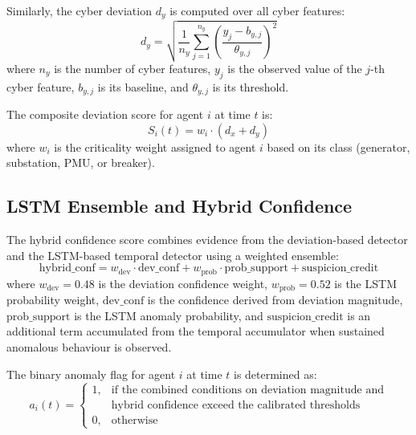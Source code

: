 \par \vspace{0.25cm}
\noindent
Similarly, the cyber deviation $d_y$ is computed over all cyber features:
\begin{equation}
d_y = \sqrt{ \frac{1}{n_y} \sum_{j=1}^{n_y} \left( \frac{y_j - b_{y,j}}{\theta_{y,j}} \right)^2 }
\label{eq:dy}
\end{equation}
where $n_y$ is the number of cyber features, $y_j$ is the observed value of the $j$-th cyber feature, $b_{y,j}$ is its baseline, and $\theta_{y,j}$ is its threshold.

\par \vspace{0.25cm}
\noindent
The composite deviation score for agent $i$ at time $t$ is:
\begin{equation}
S_i(t) = w_i \cdot (d_x + d_y)
\label{eq:si}
\end{equation}
where $w_i$ is the criticality weight assigned to agent $i$ based on its class (generator, substation, PMU, or breaker).

\subsection{LSTM Ensemble and Hybrid Confidence}
\label{sec:hybrid_confidence}

The hybrid confidence score combines evidence from the deviation-based detector and the LSTM-based temporal detector using a weighted ensemble:
\begin{equation}
\text{hybrid\_conf} = w_{\text{dev}} \cdot \text{dev\_conf} + w_{\text{prob}} \cdot \text{prob\_support} + \text{suspicion\_credit}
\label{eq:hybrid}
\end{equation}
where $w_{\text{dev}} = 0.48$ is the deviation confidence weight, $w_{\text{prob}} = 0.52$ is the LSTM probability weight, $\text{dev\_conf}$ is the confidence derived from deviation magnitude, $\text{prob\_support}$ is the LSTM anomaly probability, and $\text{suspicion\_credit}$ is an additional term accumulated from the temporal accumulator when sustained anomalous behaviour is observed.

\par \vspace{0.25cm}
\noindent
The binary anomaly flag for agent $i$ at time $t$ is determined as:
\begin{equation}
a_i(t) =
\begin{cases}
1, & \text{if the combined conditions on deviation magnitude and} \\
   & \text{hybrid confidence exceed the calibrated thresholds} \\
0, & \text{otherwise}
\end{cases}
\label{eq:ai}
\end{equation}

